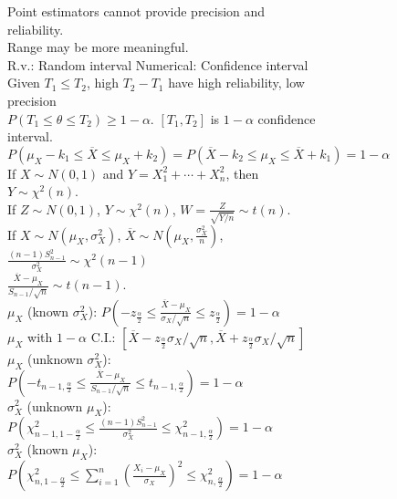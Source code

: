 \documentclass{article}
\begin{document}
\begin{figure}[h!]
    \begin{subfigure}[h!]{0.49\textwidth}
        Point estimators cannot provide precision and reliability.\\
        Range may be more meaningful.\\
        R.v.: Random interval \quad Numerical: Confidence interval\\
        Given $T_{1}\leq T_{2}$, high $T_{2}-T_{1}$ have high reliability, low precision\\
        $P(T_{1}\leq\theta\leq T_{2})\geq 1-\alpha$. $[T_{1},T_{2}]$ is $1-\alpha$ confidence interval.\\
        $P(\mu_{X}-k_{1}\leq\overline{X}\leq\mu_{X}+k_{2})=P(\overline{X}-k_{2}\leq\mu_{X}\leq\overline{X}+k_{1})=1-\alpha$\\
        If $X\sim N(0,1)$ and $Y=X_{1}^{2}+\cdots+X_{n}^{2}$, then $Y\sim\chi^{2}(n)$.\\
        If $Z\sim N(0,1)$, $Y\sim\chi^{2}(n)$, $W=\frac{Z}{\sqrt{Y/n}}\sim t(n)$.\\
        If $X\sim N(\mu_{X},\sigma_{X}^{2})$, $\overline{X}\sim N(\mu_{X},\frac{\sigma_{X}^{2}}{n})$, $\frac{(n-1)S_{n-1}^{2}}{\sigma_{X}^{2}}\sim\chi^{2}(n-1)$\\
        $\frac{\overline{X}-\mu_{X}}{S_{n-1}/\sqrt{n}}\sim t(n-1)$.\\
        $\mu_{X}$ (known $\sigma_{X}^{2}$): $P(-z_{\frac{\alpha}{2}}\leq\frac{\overline{X}-\mu_{X}}{\sigma_{X}/\sqrt{n}}\leq z_{\frac{\alpha}{2}})=1-\alpha$\\
        $\mu_{X}$ with $1-\alpha$ C.I.: $\left[\overline{X}-z_{\frac{\alpha}{2}}\sigma_{X}/\sqrt{n},\overline{X}+z_{\frac{\alpha}{2}}\sigma_{X}/\sqrt{n}\right]$\\
        $\mu_{X}$ (unknown $\sigma_{X}^{2}$): $P(-t_{n-1,\frac{\alpha}{2}}\leq\frac{\overline{X}-\mu_{X}}{S_{n-1}/\sqrt{n}}\leq t_{n-1,\frac{\alpha}{2}})=1-\alpha$\\
        $\sigma_{X}^{2}$ (unknown $\mu_{X}$): $P(\chi_{n-1,1-\frac{\alpha}{2}}^{2}\leq\frac{(n-1)S_{n-1}^{2}}{\sigma_{X}^{2}}\leq\chi_{n-1,\frac{\alpha}{2}}^{2})=1-\alpha$\\
        $\sigma_{X}^{2}$ (known $\mu_{X}$): $P(\chi_{n,1-\frac{\alpha}{2}}^{2}\leq\sum_{i=1}^{n}\left(\frac{X_{i}-\mu_{X}}{\sigma_{X}}\right)^{2}\leq\chi_{n,\frac{\alpha}{2}}^{2})=1-\alpha$
    \end{subfigure}
\end{figure}
\end{document}
